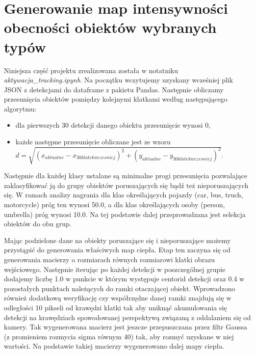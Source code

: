 \documentclass[a4paper]{article}
\begin{document}
\section{Generowanie map intensywności obecności obiektów wybranych typów}
\label{sec:generowanie}
Niniejsza część projektu zrealizowana została w notatniku \textit{aktywacja\_tracking.ipynb}. Na początku wczytujemy uzyskany wcześniej plik JSON z detekcjami do dataframe z pakietu Pandas. Następnie obliczamy przesunięcia obiektów pomiędzy kolejnymi klatkami według następującego algorytmu:
\begin{itemize}
    \item dla pierwszych 30 detekcji danego obiektu przesunięcie wynosi 0,
    \item każde następne przesunięcie obliczane jest ze wzoru\\ $d=\sqrt{(x_{aktualne} - x_{30klatekwczesniej})^2 + (y_{aktualne} - y_{30klatekwczesniej})^2}$.
\end{itemize}
Następnie dla każdej klasy ustalane są minimalne progi przesunięcia pozwalające zaklasyfikować ją do grupy obiektów poruszających się bądź też nieporuszających się. W ramach analizy nagrania dla klas określających pojazdy (car, bus, truch, motorcycle) próg ten wynosi 50.0, a dla klas określających osoby (person, umbrella) próg wynosi 10.0. Na tej podstawie dalej przeprowadzana jest selekcja obiektów do obu grup.

Mając podzielone dane na obiekty poruszające się i nieporuszające możemy przystąpić do generowania właściwych map ciepła. Etap ten zaczyna się od generowania macierzy o rozmiarach równych rozmiarowi klatki obrazu wejściowego. Następnie iterując po każdej detekcji w poszczególnej grupie dodajemy liczbę 1.0 w punkcie w którym występuje centorid detekcji oraz 0.4 w pozostałych punktach należących do ramki otaczającej obiekt. Wprowadzono również dodatkową weryfikację czy współrzędne danej ramki znajdują się w odległości 10 pikseli od krawędzi klatki tak aby uniknąć akumulowania się detekcji na krawędziach spowodowanej perspektywą związaną z oddalaniem się od kamery. Tak wygenerowana macierz jest jeszcze przepuszczana przez filtr Gaussa (z promieniem rozmycia sigma równym 40) tak, aby rozmyć uzyskane w niej wartości. Na podstawie takiej macierzy wygenerowano dalej mapy ciepła.
\end{document}
